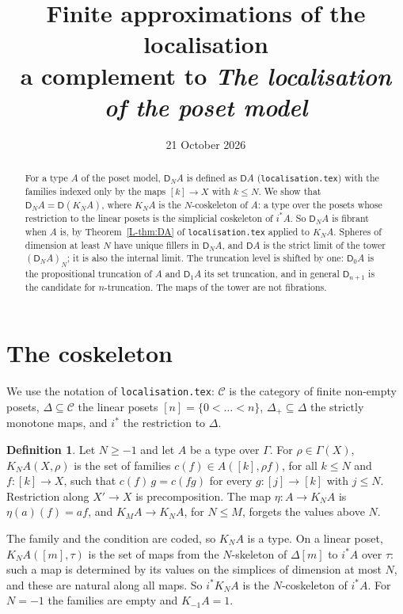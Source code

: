 \documentclass[11pt]{article}
\title{Finite approximations of the localisation\\[3pt]
\large a complement to \emph{The localisation of the poset model}}
\author{}
\date{21 October 2026}
\newcommand{\C}{\mathcal{C}}
\newcommand{\D}{\mathsf{D}}
\theoremstyle{plain}
\theoremstyle{definition}
\newtheorem{definition}[theorem]{Definition}
\theoremstyle{remark}
\begin{document}
\maketitle

\begin{abstract}
\noindent
For a type $A$ of the poset model, $\D_NA$ is defined as $\D A$
(\texttt{localisation.tex}) with the families indexed only by the maps
$[k]\to X$ with $k\le N$. We show that $\D_N A=\D(K_NA)$, where $K_NA$ is
the $N$-coskeleton of $A$: a type over the posets whose restriction to the
linear posets is the simplicial coskeleton of $i^*A$. So $\D_NA$ is fibrant
when $A$ is, by Theorem~\ref{L-thm:DA} of \texttt{localisation.tex}
applied to $K_NA$. Spheres of dimension at least $N$ have unique fillers
in $\D_NA$, and $\D A$ is the strict limit of the tower $(\D_NA)_N$; it is
also the internal limit. The truncation level is shifted by one: $\D_0A$
is the propositional truncation of $A$ and $\D_1A$ its set truncation, and
in general $\D_{n+1}$ is the candidate for $n$-truncation. The maps of the
tower are not fibrations.
\end{abstract}

\section{The coskeleton}\label{sec:cosk}

We use the notation of \texttt{localisation.tex}: $\C$ is the category of
finite non-empty posets, $\Delta\subseteq\C$ the linear posets
$[n]=\{0<\dots<n\}$, $\Delta_+\subseteq\Delta$ the strictly monotone maps,
and $i^*$ the restriction to $\Delta$.

\begin{definition}
Let $N\ge-1$ and let $A$ be a type over $\Gamma$. For $\rho\in\Gamma(X)$,
$K_NA(X,\rho)$ is the set of families $c(f)\in A([k],\rho f)$, for all
$k\le N$ and $f:[k]\to X$, such that $c(f)\,g=c(fg)$ for every
$g:[j]\to[k]$ with $j\le N$. Restriction along $X'\to X$ is precomposition.
The map $\eta:A\to K_NA$ is $\eta(a)(f)=af$, and $K_MA\to K_NA$, for
$N\le M$, forgets the values above $N$.
\end{definition}

The family and the condition are coded, so $K_NA$ is a type. On a linear
poset, $K_NA([m],\tau)$ is the set of maps from the $N$-skeleton of
$\Delta[m]$ to $i^*A$ over $\tau$: such a map is determined by its values
on the simplices of dimension at most $N$, and these are natural along all
maps. So $i^*K_NA$ is the $N$-coskeleton of $i^*A$. For $N=-1$ the
families are empty and $K_{-1}A=1$.
\end{document}
